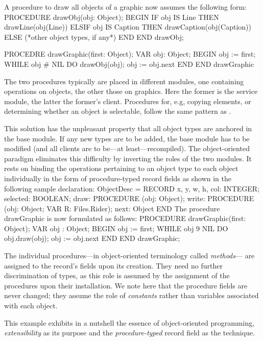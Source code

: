 A procedure  to draw all objects of a graphic now assumes the following form:
\begintt
PROCEDURE drawObj(obj: Object);
BEGIN
  IF obj IS Line THEN drawLine(obj(Line))
  ELSIF obj IS Caption THEN drawCaption(obj(Caption))
  ELSE (*other object types, if any*)
  END
END drawObj;

PROCEDRE drawGraphic(first: Object);
  VAR obj: Object;
BEGIN
  obj := first;
  WHILE obj # NIL DO drawObj(obj); obj := obj.next END
END drawGraphic
\endtt

\noindent The two procedures typically are placed in different modules, one containing operations on objects, the other those on graphics. Here the former is the service module, the latter the former's client. Procedures for, e.g, copying elements, or determining whether an object is selectable, follow the same pattern as .

This solution has the unpleasant property that all object types are anchored in the base module. If any new types are to be added, the base module has to be modified (and all clients are to be---at least---recompiled). The object-oriented paradigm eliminates this difficulty by inverting the roles of the two modules. It rests on binding the operations pertaining to an object type to each object individually in the form of procedure-typed record fields as shown in the following sample declaration:
\begintt
ObjectDesc = RECORD
  x, y, w, h, col: INTEGER; selected: BOOLEAN;
  draw: PROCEDURE (obj: Object);
  write: PROCEDURE (obj: Object; VAR R: Files.Rider);
  next: Object
END
\endtt
The procedure drawGraphic is now formulated as follows:
\begintt
PROCEDURE drawGraphic(first: Object);
  VAR obj : Object;
BEGIN
  obj := first;
  WHILE obj 9 NIL DO obj.draw(obj); obj := obj.next END
END drawGraphic;
\endtt

The individual procedures---in object-oriented terminology called \emph{methods}--- are assigned to the record's fields upon its creation. They need no further discrimination of types, as this role is assumed by the assignment of the procedures upon their installation. We note here that the procedure fields are never changed; they assume the role of \emph{constants} rather than variables associated with each object.

This example exhibits in a nutshell the essence of object-oriented programming, \emph{extensibility} as its purpose and the \emph{procedure-typed} record field as the technique.

